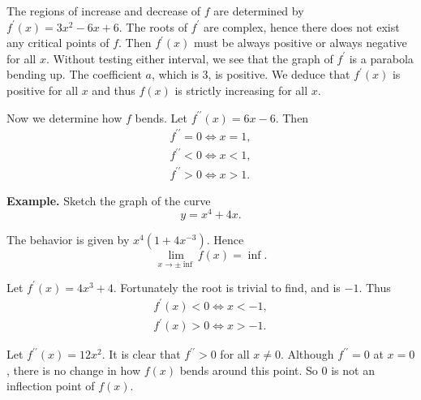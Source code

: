 The regions of increase and decrease of $f$ are determined by $f^\prime(x) = 3x^2 - 6x + 6$. The roots of $f^\prime$ are complex, hence there does not exist any critical points of $f$. Then $f^\prime(x)$ must be always positive or always negative for all $x$. Without testing either interval, we see that the graph of $f^\prime$ is a parabola bending up. The coefficient $a$, which is $3$, is positive. We deduce that $f^\prime(x)$ is positive for all $x$ and thus $f(x)$ is strictly increasing for all $x$.

Now we determine how $f$ bends. Let $f^{\prime\prime}(x) = 6x - 6$. Then
\begin{align}
f^{\prime\prime} = 0 \Leftrightarrow x = 1,\\
f^{\prime\prime} < 0 \Leftrightarrow x < 1,\\
f^{\prime\prime} > 0 \Leftrightarrow x > 1.
\end{align}

\textbf{Example.} Sketch the graph of the curve
\[y = x^4 + 4x.\]

The behavior is given by $x^4(1 + 4x^{-3})$. Hence
\[\lim_{x\to\pm\inf} f(x) = \inf.\]

Let $f^\prime(x) = 4x^3 + 4$. Fortunately the root is trivial to find, and is $-1$. Thus
\begin{align}
f^\prime(x) < 0 \Leftrightarrow x < -1,\\
f^\prime(x) > 0 \Leftrightarrow x > -1.
\end{align}

Let $f^{\prime\prime}(x) = 12x^2$. It is clear that $f^{\prime\prime} > 0$ for all $x \ne 0$. Although $f^{\prime\prime} = 0$ at $x = 0$, there is no change in how $f(x)$ bends around this point. So $0$ is not an inflection point of $f(x)$.
